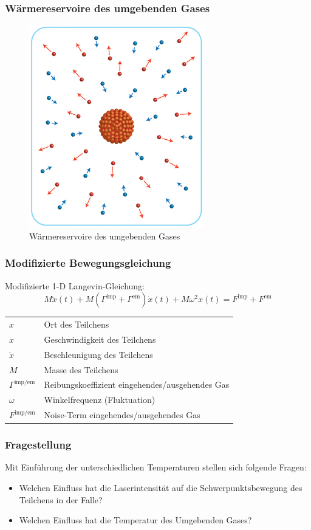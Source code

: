 \documentclass[handout]{beamer}
\begin{document}
\begin{frame}
\frametitle{Wärmereservoire des umgebenden Gases}
\begin{center}
\begin{figure}
\includegraphics[scale=0.4]{../images/nano_nonequilibrium_cropped.jpg}
\caption{Wärmereservoire des umgebenden Gases \cite{Kroy2014}}
\end{figure}
\end{center}
\end{frame}


\begin{frame}
\frametitle{Modifizierte Bewegungsgleichung}
Modifizierte 1-D Langevin-Gleichung:
\begin{equation}
    M\ddot{x}(t) + M\left(\Gamma^\text{imp}+\Gamma^\text{em}\right)\dot{x}(t) + M\omega^2x(t) =F^\text{imp}+F^\text{em}
\end{equation}
\begin{tabular}{l l}
$x$ & Ort des Teilchens\\
$\dot{x}$ & Geschwindigkeit des Teilchens\\
$\ddot{x}$ & Beschleunigung des Teilchens\\
$M$ & Masse des Teilchens\\
$\Gamma^\text{imp/em}$ & Reibungskoeffizient eingehendes/ausgehendes Gas\\
$\omega$ & Winkelfrequenz (Fluktuation)\\
$F^\text{imp/em}$ & Noise-Term eingehendes/ausgehendes Gas
\end{tabular}
\end{frame}

\begin{frame}
\frametitle{Fragestellung}
Mit Einführung der unterschiedlichen Temperaturen stellen sich folgende Fragen:
\begin{itemize}
\item Welchen Einfluss hat die Laserintensität auf die Schwerpunktsbewegung des Teilchens in der Falle?
\item Welchen Einfluss hat die Temperatur des Umgebenden Gases?
\end{itemize}
\end{frame}
\end{document}
